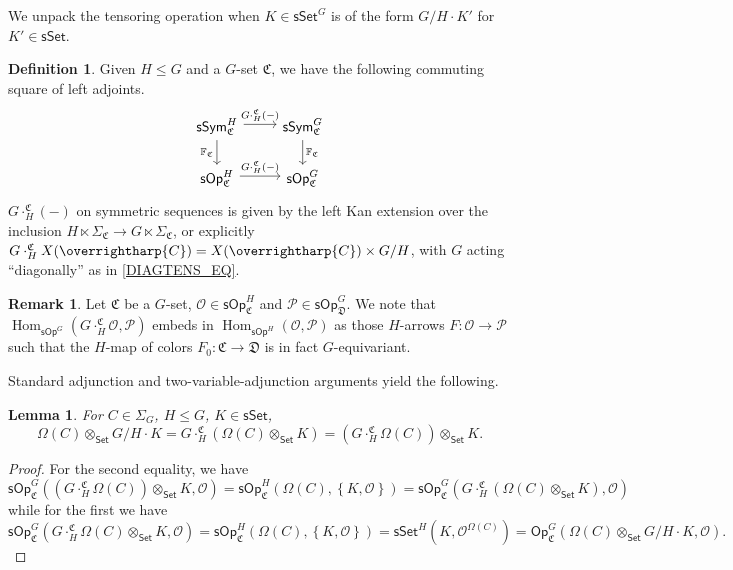 \documentclass[a4paper,10pt
,draft
]{article}%
\numberwithin{equation}{section}
\numberwithin{figure}{section}
\newtheorem{lemma}[equation]{Lemma}%
\theoremstyle{definition} %
\newtheorem{definition}[equation]{Definition}%
\newtheorem{remark}[equation]{Remark}%
\newcommand{\set}[1]{\left\{#1\right\}}%
\newcommand{\vect}[1]{\text{\overrightharp{\ensuremath{#1}}}}
\newcommand{\Set}{\ensuremath{\mathsf{Set}}}
\newcommand{\sSet}{\ensuremath{\mathsf{sSet}}}%
\newcommand{\Op}{\mathsf{Op}}%
\newcommand{\sOp}{\ensuremath{\mathsf{sOp}}}%
\newcommand{\sSym}{\ensuremath{\mathsf{sSym}}}%
\DeclareMathOperator{\Hom}{Hom}%
\renewcommand{\O}{\ensuremath{\mathcal O}}
\renewcommand{\P}{\ensuremath{\mathcal P}}
\newcommand{\1}{\ensuremath{\mathbbm 1}}%
\begin{document}
We unpack the tensoring operation when $K \in \sSet^G$ is of the form $G/H \cdot K'$ for $K' \in \sSet$.
\begin{definition}
      Given $H \leq G$ and a $G$-set $\mathfrak C$, 
      we have the following commuting square of left adjoints.
      \[
            \begin{tikzcd}
                  \sSym^H_{\mathfrak C} \arrow[r, shift left, "G \cdot_H^{\mathfrak C} (-)"] \arrow[d, "\mathbb F_{\mathfrak C}"']
                  &
                  \sSym^G_{\mathfrak C} \arrow[d, "\mathbb F_{\mathfrak C}"]
                  \\
                  \sOp^H_{\mathfrak C} \arrow[r, shift left, "G \cdot_H^{\mathfrak C} (-)"]
                  &
                  \sOp^G_{\mathfrak C}
            \end{tikzcd}
      \]
      $G \cdot_H^{\mathfrak C} (-)$ on symmetric sequences is given by the left Kan extension over the inclusion
      $H \ltimes \Sigma_{\mathfrak C} \to G \ltimes \Sigma_{\mathfrak C}$,
      or explicitly
      $G \cdot_H^{\mathfrak C} X (\vect C) = X(\vect C) \times G/H$, with $G$ acting ``diagonally'' as in \eqref{DIAGTENS_EQ}.
\end{definition}

\begin{remark}
      Let $\mathfrak C$ be a $G$-set, 
      $\O \in \sOp^H_{\mathfrak C}$ and $\P \in \sOp^G_{\mathfrak D}$. 
      We note that $\Hom_{\sOp^G}(G \cdot_H^{\mathfrak C}\O, \P)$ embeds in $\Hom_{\sOp^H}(\O,\P)$
      as those $H$-arrows $F \colon \O \to \P$ such that the $H$-map of colors $F_0 \colon \mathfrak C \to \mathfrak D$
      is in fact $G$-equivariant.
\end{remark}

Standard adjunction and two-variable-adjunction arguments yield the following.
\begin{lemma}
      For $C \in \Sigma_G$, $H \leq G$, $K \in \sSet$,
      \begin{equation}
            \label{GHTENS_EQ}
            \Omega(C) \otimes_{\Set}G/H \cdot K = G \cdot_H^{\mathfrak C}\left( \Omega(C) \otimes_\Set K\right)
            = \left( G \cdot_H^{\mathfrak C} \Omega(C) \right) \otimes_\Set K.
      \end{equation}
\end{lemma}
{\color{OliveGreen} %
  \begin{proof}
        For the second equality, we have
        \[
              \sOp^G_{\mathfrak C}((G \cdot_H^{\mathfrak C} \Omega(C)) \otimes_\Set K, \O)
              = \sOp_{\mathfrak C}^H(\Omega(C), \set{K,\O})
              = \sOp_{\mathfrak C}^G(G \cdot_H^{\mathfrak C}(\Omega(C) \otimes_\Set K), \O)
        \]
        while for the first we have
        \[
              \sOp_{\mathfrak C}^G(G \cdot_H^{\mathfrak C}\Omega(C) \otimes_\Set K, \O)
              = \sOp_{\mathfrak C}^H(\Omega(C), \set{K,\O})
              = \sSet^H(K, \O^{\Omega(C)})
              = \Op^G_{\mathfrak C}(\Omega(C) \otimes_\Set G/H \cdot K, \O).
        \]      
  \end{proof}
} %
\end{document}
